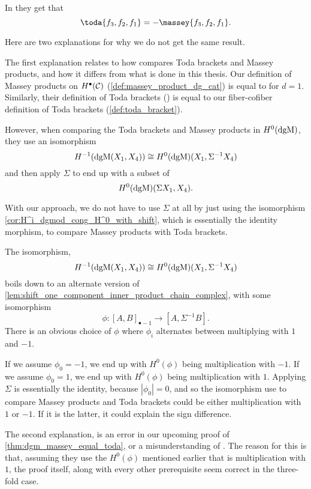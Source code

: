 \begin{remark}
    In \cite[Theorem 4.2.6]{Jasso-Muro_2023} they get that
    \[
        \toda{f_3, f_2, f_1} = -\massey{f_3, f_2, f_1}.
    \]

    Here are two explanations for why we do not get the same result.
    
    The first explanation relates to how \cite{Jasso-Muro_2023} compares Toda brackets and Massey products, and how it differs from what is done in this thesis. Our definition of Massey products on \( H^{\bullet}({\mathcal{C}}) \) (\autoref{def:massey_product_dg_cat}) is equal to \cite[Definition 4.2.1]{Jasso-Muro_2023} for \( d = 1 \). Similarly, their definition of Toda brackets (\cite[Definition 4.1.6]{Jasso-Muro_2023}) is equal to our fiber-cofiber definition of Toda brackets (\autoref{def:toda_bracket}).
    
    However, when comparing the Toda brackets and Massey products in \( H^0(\operatorname{dgM}) \), they use an isomorphism
    \[
        H^{-1}(\operatorname{dgM}(X_1, X_4)) \cong H^0(\operatorname{dgM})(X_1, \Sigma^{-1} X_4)
    \]
    and then apply \( \Sigma \) to end up with a subset of
    \[
        H^0(\operatorname{dgM})(\Sigma X_1, X_4).
    \] 

    With our approach, we do not have to use \( \Sigma \) at all by just using the isomorphism \autoref{cor:H^i_dgmod_cong_H^0_with_shift}, which is essentially the identity morphism, to compare Massey products with Toda brackets.

    The isomorphism,
    \[
        H^{-1}(\operatorname{dgM}(X_1, X_4)) \cong H^0(\operatorname{dgM})(X_1, \Sigma^{-1} X_4)
    \]
    boils down to an alternate version of \autoref{lem:shift_one_component_inner_product_chain_complex}, with some isomorphism
    \[
        \phi: [A, B]_{\bullet - 1} \to [A, \Sigma^{-1} B].
    \]
    There is an obvious choice of \( \phi \) where \( \phi_i \) alternates between multiplying with \( 1 \) and \( -1 \).

    If we assume \( \phi_0 = -1 \), we end up with \( H^0(\phi) \) being multiplication with \( -1 \). If we assume \( \phi_0 = 1 \), we end up with \( H^0(\phi) \) being multiplication with \( 1 \). Applying \( \Sigma \) is essentially the identity, because \( |\phi_0| = 0 \), and so the isomorphism \cite{Jasso-Muro_2023} use to compare Massey products and Toda brackets could be either multiplication with \( 1 \) or \( -1 \). If it is the latter, it could explain the sign difference.

    The second explanation, is an error in our upcoming proof of \autoref{thm:dgm_massey_equal_toda}, or a misunderstanding of \cite[Proposition 4.2.8]{Jasso-Muro_2023}. The reason for this is that, assuming they use the \( H^0(\phi) \) mentioned earlier that is multiplication with \( 1 \), the proof itself, along with every other prerequisite seem correct in the three-fold case.


\end{remark}
